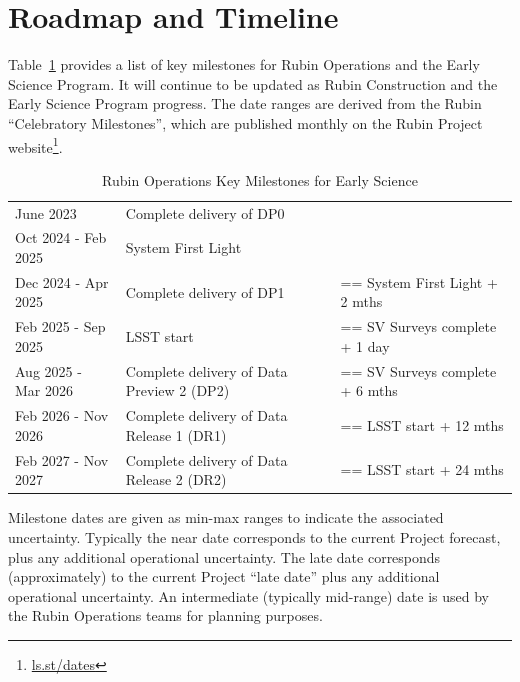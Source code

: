 \section{Roadmap and Timeline} \label{sec:timeline}

Table~\ref{tab:milestones} provides a list of key milestones for Rubin Operations and the Early Science Program.
It will continue to be updated as Rubin Construction and the Early Science Program progress. 
The date ranges are derived from the Rubin ``Celebratory Milestones'', which are  published monthly on the Rubin Project website\footnote{\url{ls.st/dates}}. 

\begin{table}[ht]
\centering
\fontsize{10}{12}\selectfont 
\setlength{\tabcolsep}{8pt} %
\renewcommand{\arraystretch}{1.4} %
\begin{tabular}{|l|ll|}
\hline
\rowcolor{gray!30} %
 \multicolumn{3}{|l|}{\textbf{Rubin Observatory Key Milestones for Early Science}} \\\hline
June 2023 & Complete delivery of DP0 &   \\
Oct 2024 - Feb 2025 & System First Light &   \\
Dec 2024 - Apr 2025 & Complete delivery of DP1 & == System First Light  +  2 mths  \\
Feb 2025 - Sep 2025 & LSST start & == SV Surveys complete  + 1 day  \\
Aug 2025 - Mar 2026 & Complete delivery of Data Preview 2 (DP2)  & == SV Surveys complete  + 6 mths  \\
Feb 2026 - Nov 2026 & Complete delivery of Data Release 1 (DR1) & == LSST  start + 12 mths \\
Feb 2027 - Nov 2027 & Complete delivery of Data Release 2 (DR2) &== LSST  start + 24 mths \\
\hline
\end{tabular}
\caption{Rubin Operations Key Milestones for Early Science}
\label{tab:milestones}
\end{table}


Milestone dates are given as min-max ranges to indicate the associated uncertainty. 
Typically the near date corresponds to the current Project forecast, plus any additional operational uncertainty.
The late date corresponds (approximately) to the current Project ``late date'' plus any additional operational uncertainty.
An intermediate (typically mid-range) date is used by the Rubin Operations teams for planning purposes. 

